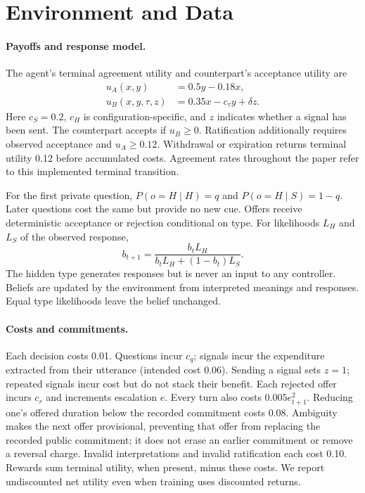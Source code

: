 \section{Environment and Data}
\label{app:environment}
\paragraph{Payoffs and response model.}
The agent's terminal agreement utility and counterpart's acceptance utility are
\begin{align}
 u_A(x,y)&=0.5y-0.18x,\\
 u_B(x,y,\tau,z)&=0.35x-c_\tau y+\delta z.
\end{align}
Here $c_S=0.2$, $c_H$ is configuration-specific, and $z$ indicates whether a signal has been sent. The counterpart accepts if $u_B\geq0$. Ratification additionally requires observed acceptance and $u_A\geq0.12$. Withdrawal or expiration returns terminal utility 0.12 before accumulated costs. Agreement rates throughout the paper refer to this implemented terminal transition.

For the first private question, $P(o=H\mid H)=q$ and $P(o=H\mid S)=1-q$. Later questions cost the same but provide no new cue. Offers receive deterministic acceptance or rejection conditional on type. For likelihoods $L_H$ and $L_S$ of the observed response,
\begin{equation}
 b_{t+1}=\frac{b_t L_H}{b_t L_H+(1-b_t)L_S}.
\end{equation}
The hidden type generates responses but is never an input to any controller. Beliefs are updated by the environment from interpreted meanings and responses. Equal type likelihoods leave the belief unchanged.

\paragraph{Costs and commitments.}
Each decision costs 0.01. Questions incur $c_q$; signals incur the expenditure extracted from their utterance (intended cost 0.06). Sending a signal sets $z=1$; repeated signals incur cost but do not stack their benefit. Each rejected offer incurs $c_r$ and increments escalation $e$. Every turn also costs $0.005e_{t+1}^2$. Reducing one's offered duration below the recorded commitment costs 0.08. Ambiguity makes the next offer provisional, preventing that offer from replacing the recorded public commitment; it does not erase an earlier commitment or remove a reversal charge. Invalid interpretations and invalid ratification each cost 0.10. Rewards sum terminal utility, when present, minus these costs. We report undiscounted net utility even when training uses discounted returns.

